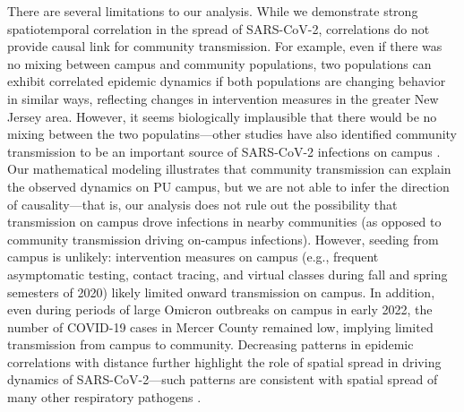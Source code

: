 \documentclass[12pt]{article}
\begin{document}
There are several limitations to our analysis.
While we demonstrate strong spatiotemporal correlation in the spread of SARS-CoV-2, correlations do not provide causal link for community transmission.
For example, even if there was no mixing between campus and community populations, two populations can exhibit correlated epidemic dynamics if both populations are changing behavior in similar ways, reflecting changes in intervention measures in the greater New Jersey area.
However, it seems biologically implausible that there would be no mixing between the two populatins---other studies have also identified community transmission to be an important source of SARS-CoV-2 infections on campus \citep{fox2021response,hamer2021assessment}.
Our mathematical modeling illustrates that community transmission can explain the observed dynamics on PU campus, but we are not able to infer the direction of causality---that is, our analysis does not rule out the possibility that transmission on campus drove infections in nearby communities (as opposed to community transmission driving on-campus infections).
However, seeding from campus is unlikely: 
intervention measures on campus (e.g., frequent asymptomatic testing, contact tracing, and virtual classes during fall and spring semesters of 2020) likely limited onward transmission on campus.
In addition, even during periods of large Omicron outbreaks on campus in early 2022, the number of COVID-19 cases in Mercer County remained low, implying limited transmission from campus to community.
Decreasing patterns in epidemic correlations with distance further highlight the role of spatial spread in driving dynamics of SARS-CoV-2---such patterns are consistent with spatial spread of many other respiratory pathogens \citep{grenfell2001travelling, viboud2006synchrony, baker2019epidemic}.
\end{document}
